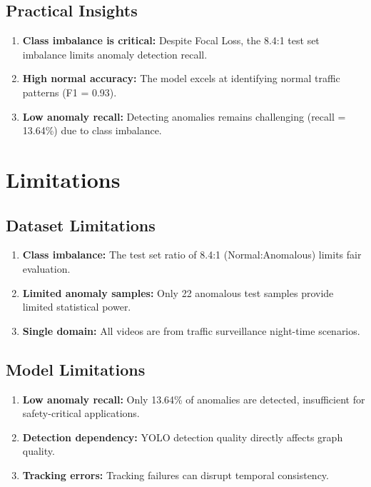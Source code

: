 \subsection{Practical Insights}

\begin{enumerate}
    \item \textbf{Class imbalance is critical:} Despite Focal Loss, the 8.4:1 test set imbalance limits anomaly detection recall.
    
    \item \textbf{High normal accuracy:} The model excels at identifying normal traffic patterns (F1 = 0.93).
    
    \item \textbf{Low anomaly recall:} Detecting anomalies remains challenging (recall = 13.64\%) due to class imbalance.
\end{enumerate}

\section{Limitations}

\subsection{Dataset Limitations}

\begin{enumerate}
    \item \textbf{Class imbalance:} The test set ratio of 8.4:1 (Normal:Anomalous) limits fair evaluation.
    
    \item \textbf{Limited anomaly samples:} Only 22 anomalous test samples provide limited statistical power.
    
    \item \textbf{Single domain:} All videos are from traffic surveillance night-time scenarios.
\end{enumerate}

\subsection{Model Limitations}

\begin{enumerate}
    \item \textbf{Low anomaly recall:} Only 13.64\% of anomalies are detected, insufficient for safety-critical applications.
    
    \item \textbf{Detection dependency:} YOLO detection quality directly affects graph quality.
    
    \item \textbf{Tracking errors:} Tracking failures can disrupt temporal consistency.
\end{enumerate}

